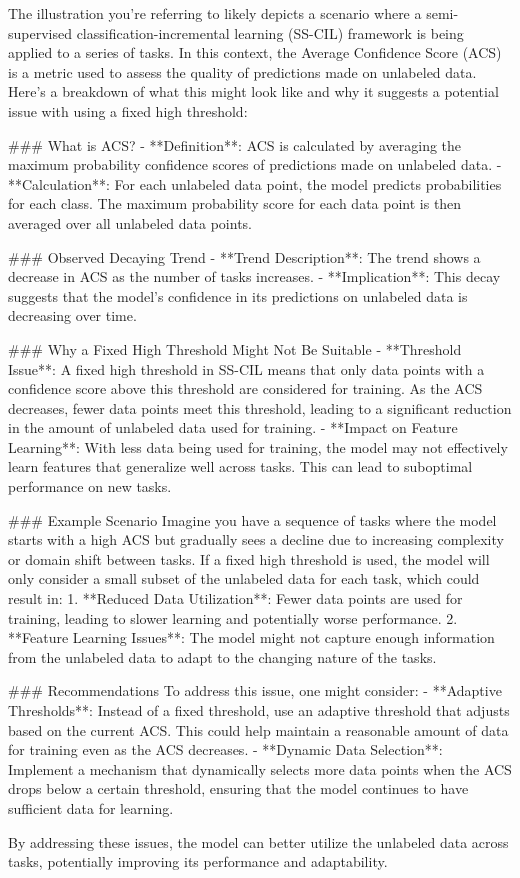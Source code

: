 The illustration you're referring to likely depicts a scenario where a semi-supervised classification-incremental learning (SS-CIL) framework is being applied to a series of tasks. In this context, the Average Confidence Score (ACS) is a metric used to assess the quality of predictions made on unlabeled data. Here's a breakdown of what this might look like and why it suggests a potential issue with using a fixed high threshold:

### What is ACS?
- **Definition**: ACS is calculated by averaging the maximum probability confidence scores of predictions made on unlabeled data.
- **Calculation**: For each unlabeled data point, the model predicts probabilities for each class. The maximum probability score for each data point is then averaged over all unlabeled data points.

### Observed Decaying Trend
- **Trend Description**: The trend shows a decrease in ACS as the number of tasks increases.
- **Implication**: This decay suggests that the model's confidence in its predictions on unlabeled data is decreasing over time.

### Why a Fixed High Threshold Might Not Be Suitable
- **Threshold Issue**: A fixed high threshold in SS-CIL means that only data points with a confidence score above this threshold are considered for training. As the ACS decreases, fewer data points meet this threshold, leading to a significant reduction in the amount of unlabeled data used for training.
- **Impact on Feature Learning**: With less data being used for training, the model may not effectively learn features that generalize well across tasks. This can lead to suboptimal performance on new tasks.

### Example Scenario
Imagine you have a sequence of tasks where the model starts with a high ACS but gradually sees a decline due to increasing complexity or domain shift between tasks. If a fixed high threshold is used, the model will only consider a small subset of the unlabeled data for each task, which could result in:
1. **Reduced Data Utilization**: Fewer data points are used for training, leading to slower learning and potentially worse performance.
2. **Feature Learning Issues**: The model might not capture enough information from the unlabeled data to adapt to the changing nature of the tasks.

### Recommendations
To address this issue, one might consider:
- **Adaptive Thresholds**: Instead of a fixed threshold, use an adaptive threshold that adjusts based on the current ACS. This could help maintain a reasonable amount of data for training even as the ACS decreases.
- **Dynamic Data Selection**: Implement a mechanism that dynamically selects more data points when the ACS drops below a certain threshold, ensuring that the model continues to have sufficient data for learning.

By addressing these issues, the model can better utilize the unlabeled data across tasks, potentially improving its performance and adaptability.